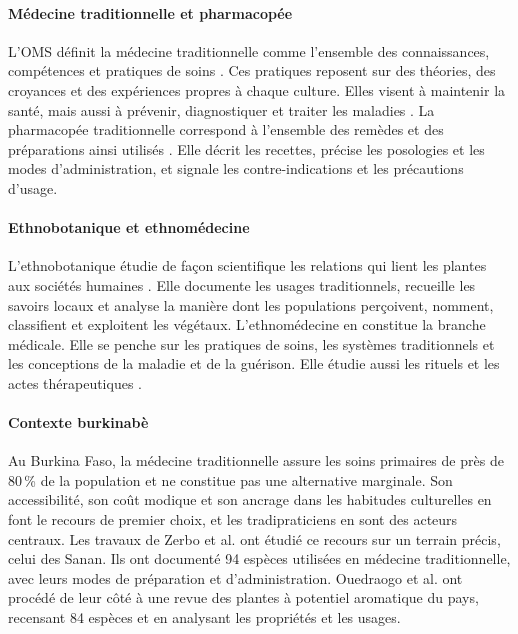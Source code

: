 \paragraph{Médecine traditionnelle et pharmacopée}
L'OMS définit la médecine traditionnelle comme l'ensemble des connaissances, compétences et pratiques de soins \cite{who2000traditional}. Ces pratiques reposent sur des théories, des croyances et des expériences propres à chaque culture. Elles visent à maintenir la santé, mais aussi à prévenir, diagnostiquer et traiter les maladies \cite{who2013strategy}. La pharmacopée traditionnelle correspond à l'ensemble des remèdes et des préparations ainsi utilisés \cite{who2000traditional}. Elle décrit les recettes, précise les posologies et les modes d'administration, et signale les contre-indications et les précautions d'usage.

\paragraph{Ethnobotanique et ethnomédecine}
L'ethnobotanique étudie de façon scientifique les relations qui lient les plantes aux sociétés humaines \cite{who2002monographs}. Elle documente les usages traditionnels, recueille les savoirs locaux et analyse la manière dont les populations perçoivent, nomment, classifient et exploitent les végétaux. L'ethnomédecine en constitue la branche médicale. Elle se penche sur les pratiques de soins, les systèmes traditionnels et les conceptions de la maladie et de la guérison. Elle étudie aussi les rituels et les actes thérapeutiques \cite{who2002monographs}.

\paragraph{Contexte burkinabè}
Au Burkina Faso, la médecine traditionnelle assure les soins primaires de près de 80\,\% de la population \cite{ares2018medecine} et ne constitue pas une alternative marginale. Son accessibilité, son coût modique et son ancrage dans les habitudes culturelles en font le recours de premier choix, et les tradipraticiens en sont des acteurs centraux. Les travaux de Zerbo et al. \cite{zerbo_plantes_2011} ont étudié ce recours sur un terrain précis, celui des Sanan. Ils ont documenté 94 espèces utilisées en médecine traditionnelle, avec leurs modes de préparation et d'administration. Ouedraogo et al. \cite{ouedraogo_revue_2024} ont procédé de leur côté à une revue des plantes à potentiel aromatique du pays, recensant 84 espèces et en analysant les propriétés et les usages.

